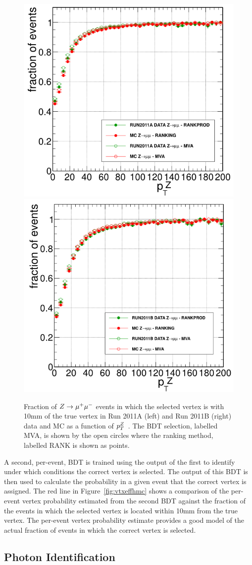 \begin{figure}
\includegraphics[width=.49\textwidth]{hgg7TeV/generalPlots/PT_vtx_z_2011A.png}
\includegraphics[width=.49\textwidth]{hgg7TeV/generalPlots/PT_vtx_z_2011B.png}
\caption{Fraction of $Z\rightarrow \mu^{+}\mu^{-}$ events in which the selected vertex is with 10mm of the 
true vertex in Run 2011A (left) and Run 2011B (right) data and MC as a function of $p_{T}^{Z}$~\citep{AN-12-048}. 
The BDT selection, labelled MVA, is shown by the open circles where the ranking method, labelled RANK 
is shown as points.}
\label{fig:vtxzmumu}
\end{figure} 

A second, per-event, BDT is trained using the output of the first to identify 
under which conditions the correct vertex is selected. The output of this BDT is then used to 
calculate the probability in a given event that the correct vertex is assigned. The red line in Figure~\ref{fig:vtxeffhmc}
shows a comparison of the per-event vertex probability estimated from the second BDT against the 
fraction of the events in which the selected vertex is located within 10mm from the true vertex. The per-event vertex probability 
estimate provides a good model of the actual fraction of events in which the correct vertex is selected.

\subsection{Photon Identification}
\label{sec:photonidentification}


